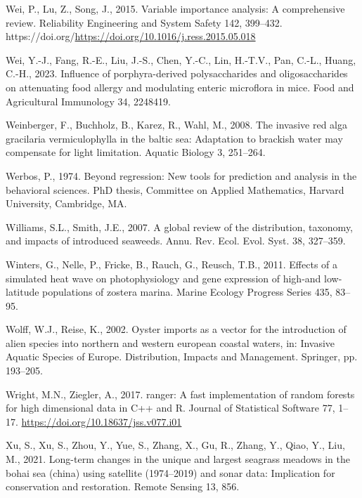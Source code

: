 \documentclass[
  letterpaper,
  11pt,
  english,
  singlespacing,
  headsepline]{MastersDoctoralThesis}
\newlength{\cslhangindent}
\newenvironment{CSLReferences}[2] %
 {\begin{list}{}{%
  \setlength{\itemindent}{0pt}
  \setlength{\leftmargin}{0pt}
  \setlength{\parsep}{0pt}
  \ifodd #1
   \setlength{\leftmargin}{\cslhangindent}
   \setlength{\itemindent}{-1\cslhangindent}
  \fi
  \setlength{\itemsep}{#2\baselineskip}}}
 {\end{list}}
\begin{document}
\begin{CSLReferences}{1}{0}
Wei, P., Lu, Z., Song, J., 2015. Variable importance analysis: A
comprehensive review. Reliability Engineering and System Safety 142,
399--432.
https://doi.org/\url{https://doi.org/10.1016/j.ress.2015.05.018}

Wei, Y.-J., Fang, R.-E., Liu, J.-S., Chen, Y.-C., Lin, H.-T.V., Pan,
C.-L., Huang, C.-H., 2023. Influence of porphyra-derived polysaccharides
and oligosaccharides on attenuating food allergy and modulating enteric
microflora in mice. Food and Agricultural Immunology 34, 2248419.

Weinberger, F., Buchholz, B., Karez, R., Wahl, M., 2008. The invasive
red alga gracilaria vermiculophylla in the baltic sea: Adaptation to
brackish water may compensate for light limitation. Aquatic Biology 3,
251--264.

Werbos, P., 1974. Beyond regression: New tools for prediction and
analysis in the behavioral sciences. PhD thesis, Committee on Applied
Mathematics, Harvard University, Cambridge, MA.

Williams, S.L., Smith, J.E., 2007. A global review of the distribution,
taxonomy, and impacts of introduced seaweeds. Annu. Rev. Ecol. Evol.
Syst. 38, 327--359.

Winters, G., Nelle, P., Fricke, B., Rauch, G., Reusch, T.B., 2011.
Effects of a simulated heat wave on photophysiology and gene expression
of high-and low-latitude populations of zostera marina. Marine Ecology
Progress Series 435, 83--95.

Wolff, W.J., Reise, K., 2002. Oyster imports as a vector for the
introduction of alien species into northern and western european coastal
waters, in: Invasive Aquatic Species of Europe. Distribution, Impacts
and Management. Springer, pp. 193--205.

Wright, M.N., Ziegler, A., 2017. {ranger}: A fast implementation of
random forests for high dimensional data in {C++} and {R}. Journal of
Statistical Software 77, 1--17.
\url{https://doi.org/10.18637/jss.v077.i01}

Xu, S., Xu, S., Zhou, Y., Yue, S., Zhang, X., Gu, R., Zhang, Y., Qiao,
Y., Liu, M., 2021. Long-term changes in the unique and largest seagrass
meadows in the bohai sea (china) using satellite (1974--2019) and sonar
data: Implication for conservation and restoration. Remote Sensing 13,
856.


\end{CSLReferences}
\end{document}
